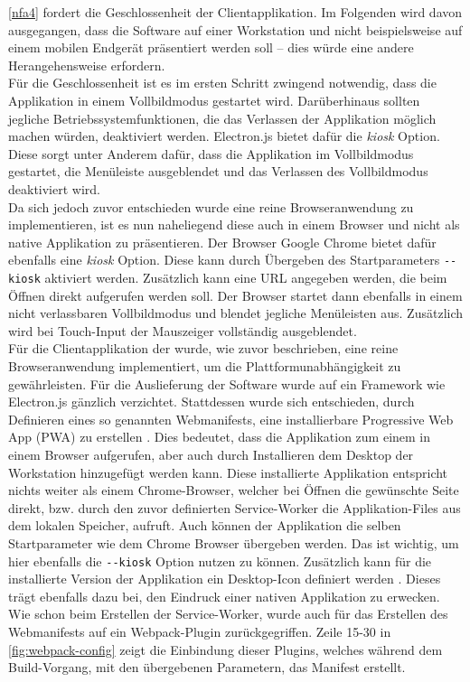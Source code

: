 \ref{nfa4} fordert die Geschlossenheit der Clientapplikation. Im Folgenden wird davon ausgegangen, 
dass die Software auf einer Workstation und nicht beispielsweise auf einem mobilen Endgerät präsentiert
werden soll -- dies würde eine andere Herangehensweise erfordern.\\
Für die Geschlossenheit ist es im ersten Schritt zwingend notwendig, dass die Applikation in einem 
Vollbildmodus gestartet wird. Darüberhinaus sollten jegliche Betriebssystemfunktionen, die das 
Verlassen der Applikation möglich machen würden, deaktiviert werden. Electron.js bietet dafür
die \emph{kiosk} Option. Diese sorgt unter Anderem dafür, dass die Applikation im Vollbildmodus gestartet, 
die Menüleiste ausgeblendet und das Verlassen des Vollbildmodus deaktiviert wird.\\
Da sich jedoch zuvor entschieden wurde eine reine Browseranwendung zu implementieren, ist es nun naheliegend 
diese auch in einem Browser und nicht als native Applikation zu präsentieren. Der Browser Google Chrome bietet
dafür ebenfalls eine \emph{kiosk} Option. Diese kann durch Übergeben des Startparameters \texttt{-{}-kiosk}
aktiviert werden. Zusätzlich kann eine URL angegeben werden, die beim Öffnen direkt aufgerufen werden soll.
Der Browser startet dann ebenfalls in einem nicht verlassbaren Vollbildmodus und blendet jegliche Menüleisten aus.
Zusätzlich wird bei Touch-Input der Mauszeiger vollständig ausgeblendet.\\

Für die Clientapplikation der \shst{} wurde, wie zuvor beschrieben, eine reine Browseranwendung implementiert,
um die Plattformunabhängigkeit zu gewährleisten. Für die Auslieferung der Software wurde auf ein Framework wie
Electron.js gänzlich verzichtet. Stattdessen wurde sich entschieden, durch Definieren eines so genannten Webmanifests,
eine installierbare Progressive Web App (PWA) zu erstellen \cite{web-app-manifest}. Dies bedeutet, 
dass die Applikation zum einem in einem Browser aufgerufen, aber auch durch Installieren dem Desktop 
der Workstation hinzugefügt werden kann. Diese installierte Applikation entspricht nichts 
weiter als einem Chrome-Browser, welcher bei Öffnen die gewünschte Seite direkt,
bzw. durch den zuvor definierten Service-Worker die Applikation-Files aus dem lokalen Speicher, aufruft. Auch
können der Applikation die selben Startparameter wie dem Chrome Browser übergeben werden. Das ist wichtig,
um hier ebenfalls die \texttt{-{}-kiosk} Option nutzen zu können.
Zusätzlich kann für die installierte Version der Applikation ein Desktop-Icon definiert werden \cite{web-app-manifest}.
Dieses trägt ebenfalls dazu bei, den Eindruck einer nativen Applikation zu erwecken.\\
Wie schon beim Erstellen der Service-Worker, wurde auch für das Erstellen des Webmanifests auf ein 
Webpack-Plugin \cite{webpack-pwa-manifest-plugin} zurückgegriffen. Zeile 15-30 in \autoref{fig:webpack-config} 
zeigt die Einbindung dieser Plugins, welches während dem Build-Vorgang, mit den übergebenen Parametern, das Manifest erstellt. 
